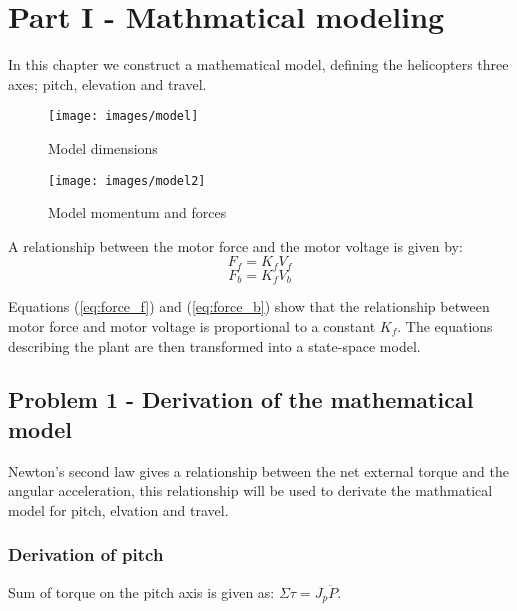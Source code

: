 \newpage
\section{Part I - Mathmatical modeling}

In this chapter we construct a mathematical model, defining the helicopters three axes; pitch, elevation and travel. 

\begin{figure}[!htb]
    \centering
    \texttt{[image: images/model]}
    \caption{Model dimensions}
    \label{poles}
\end{figure}

\begin{figure}[!htb]
    \centering
    \texttt{[image: images/model2]}
    \caption{Model momentum and forces}
    \label{poles}
\end{figure}
\newpage
A relationship between the motor force and the motor voltage is given by:
\begin{equation}\label{eq:force_f}
    F_f =K_fV_f   
\end{equation}
\begin{equation}\label{eq:force_b}
    F_b  =K_fV_b  
\end{equation}

Equations (\ref{eq:force_f}) and (\ref{eq:force_b}) show that the relationship between motor force and motor voltage is proportional to a constant $K_f$. The equations describing the plant are then transformed into a state-space model.



\subsection{Problem 1 - Derivation of the mathematical model}
Newton's second law gives a relationship between the net external torque and the angular acceleration, this relationship will be used to derivate the mathmatical model for pitch, elvation and travel.


\subsubsection{Derivation of pitch}
 Sum of torque on the pitch axis is given as: $ \Sigma{\tau}= J_p \ddot{P} $. 
  

